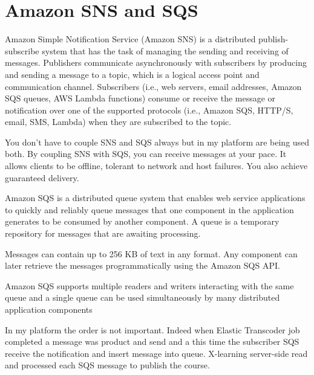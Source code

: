 \section{Amazon SNS and SQS}
\label{sec:Amazon SNS and SQS}


Amazon Simple Notification Service (Amazon SNS) is a distributed publish-subscribe system that has the task of managing the sending and receiving of messages.
Publishers communicate asynchronously with subscribers by producing and sending a message to a topic, which is a logical access point and communication channel. Subscribers (i.e., web servers, email addresses, Amazon SQS queues, AWS Lambda functions) consume or receive the message or notification over one of the supported protocols (i.e., Amazon SQS, HTTP/S, email, SMS, Lambda) when they are subscribed to the topic.\cite{aws_sns}


{\color{red}You don't have to couple SNS and SQS always but in my platform  are being used both.}
By coupling SNS with SQS, you can receive messages at your pace. It allows clients to be offline, tolerant to network and host failures. You also achieve guaranteed delivery.

Amazon SQS is a distributed queue system that enables web service applications to quickly and reliably queue messages that one component in the application generates to be consumed by another component. A queue is a temporary repository for messages that are awaiting processing.

Messages can contain up to 256 KB of text in any format. Any component can later retrieve the messages programmatically using the Amazon SQS API.

Amazon SQS supports multiple readers and writers interacting with the same queue and a single queue can be used simultaneously by many distributed application components


{\color{red} In my platform the order is not important. Indeed when Elastic Transcoder job completed a message was product and send and a this time the subscriber SQS receive the notification and insert message into queue. X-learning server-side read and processed each SQS message to publish the course.}